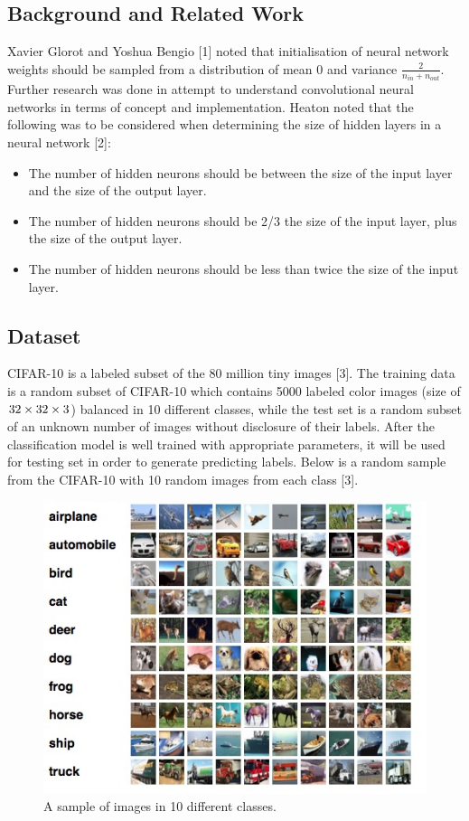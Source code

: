 \documentclass{article} %
\begin{document}
\subsection{Background and Related Work}

Xavier Glorot and Yoshua Bengio [1] noted that initialisation of neural network weights should be sampled from a distribution of mean 0 and variance $\frac{2}{n_{in}+n_{out}}$.
Further research was done in attempt to understand convolutional neural networks in terms of concept and implementation. Heaton noted that the following was to be considered when determining the size of hidden layers in a neural network [2]:
\begin{itemize}
  \item The number of hidden neurons should be between the size of the input layer and the size of the output layer.
  \item The number of hidden neurons should be 2/3 the size of the input layer, plus the size of the output layer.
  \item The number of hidden neurons should be less than twice the size of the input layer.
\end{itemize}

\subsection{Dataset}
CIFAR-10 is a labeled subset of the 80 million tiny images [3]. The training data is a random subset of CIFAR-10 which contains 5000 labeled color images (size of $32\times 32\times 3$) balanced in 10 different classes, while the test set is a random subset of an unknown number of images without disclosure of their labels. After the classification model is well trained with appropriate parameters, it will be used for testing set in order to generate predicting labels. Below is a random sample from the CIFAR-10 with 10 random images from each class [3].

\begin{figure}
\centering
\includegraphics[scale=0.55]{data.jpg}
\caption{A sample of images in 10 different classes. }
\end{figure}
\end{document}
